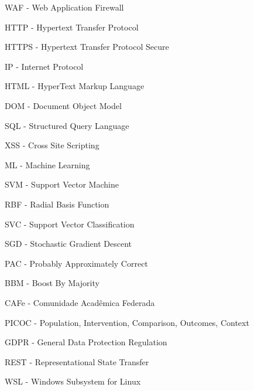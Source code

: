 \begin{siglas}
\item[WAF] - Web Application Firewall
\item[HTTP] - Hypertext Transfer Protocol
\item[HTTPS] - Hypertext Transfer Protocol Secure
\item[IP] - Internet Protocol
\item[HTML] - HyperText Markup Language 
\item[DOM] - Document Object Model
\item[SQL] - Structured Query Language
\item[XSS] - Cross Site Scripting
\item[ML] - Machine Learning
\item[SVM] - Support Vector Machine
\item[RBF] - Radial Basis Function
\item[SVC] - Support Vector Classification
\item[SGD] - Stochastic Gradient Descent
\item[PAC] - Probably Approximately Correct
\item[BBM] - Boost By Majority
\item[CAFe] - Comunidade Acadêmica Federada
\item[PICOC] - Population, Intervention, Comparison, Outcomes, Context 
\item[GDPR] - General Data Protection Regulation
\item[REST] - Representational State Transfer
\item[WSL] - Windows Subsystem for Linux
\end{siglas}